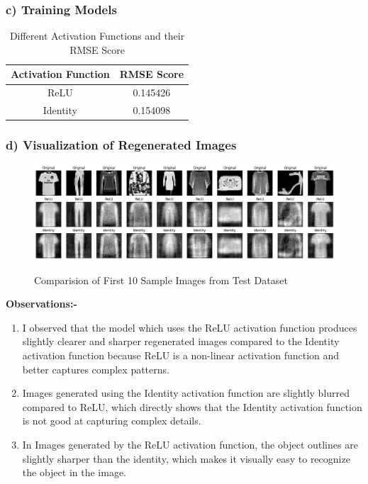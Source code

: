 \documentclass{article}
\begin{document}
\subsubsection*{c) Training Models}
\begin{table}[H]
    \centering
    \begin{tabular}{|c|c|}
        \hline
        \textbf{Activation Function} & \textbf{RMSE Score}\\ \hline
        ReLU & 0.145426\\ \hline
        Identity & 0.154098\\ \hline
    \end{tabular}
    \caption{Different Activation Functions and their RMSE Score}
\end{table}

\subsubsection*{d) Visualization of Regenerated Images}
\begin{figure}[H] %
    \centering
    \begin{minipage}{1\linewidth}
        \centering
        \includegraphics[scale=0.4]{assets/comparision.png}
        \caption{Comparision of First 10 Sample Images from Test Dataset}{}
        \label{fig:1c}
    \end{minipage}
\end{figure}

\hspace{0pt}\textbf{Observations:-}

\begin{enumerate}
\item I observed that the model which uses the ReLU activation function produces slightly clearer and sharper regenerated images compared to the Identity activation function because ReLU is a non-linear activation function and better captures complex patterns.
\item Images generated using the Identity activation function are slightly blurred compared to ReLU, which directly shows that the Identity activation function is not good at capturing complex details.
\item In Images generated by the ReLU activation function, the object outlines are slightly sharper than the identity, which makes it visually easy to recognize the object in the image.
\end{enumerate}
\end{document}
